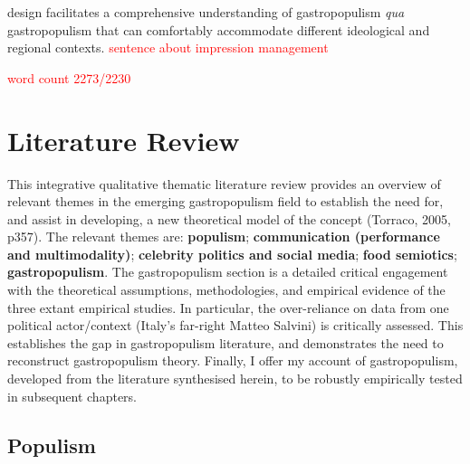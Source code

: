 \documentclass[a4paper, nobind]{templates/ociamthesis}
\begin{document}
design facilitates a comprehensive understanding of gastropopulism \emph{qua} gastropopulism that can comfortably accommodate different ideological and regional contexts. \textcolor{red}{sentence about impression management}

\textcolor{red}{word count 2273/2230}

\hypertarget{literature-review}{%
\chapter{Literature Review}\label{literature-review}}

This integrative qualitative thematic literature review provides an overview of relevant themes in the emerging gastropopulism field to establish the need for, and assist in developing, a new theoretical model of the concept (Torraco, 2005, p357). The relevant themes are: \textbf{populism}; \textbf{communication (performance and multimodality)}; \textbf{celebrity politics and social media}; \textbf{food semiotics}; \textbf{gastropopulism}. The gastropopulism section is a detailed critical engagement with the theoretical assumptions, methodologies, and empirical evidence of the three extant empirical studies. In particular, the over-reliance on data from one political actor/context (Italy's far-right Matteo Salvini) is critically assessed. This establishes the gap in gastropopulism literature, and demonstrates the need to reconstruct gastropopulism theory. Finally, I offer my account of gastropopulism, developed from the literature synthesised herein, to be robustly empirically tested in subsequent chapters.

\hypertarget{populism}{%
\section{Populism}\label{populism}}
\end{document}
